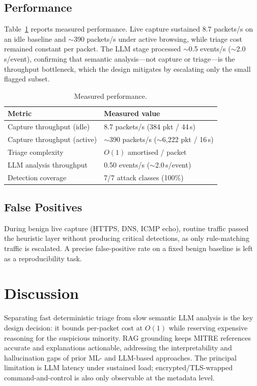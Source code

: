 \documentclass[conference]{IEEEtran}
\begin{document}
\subsection{Performance}
Table~\ref{tab:perf} reports measured performance. Live capture sustained $8.7$ packets/s on an idle baseline and $\sim$390 packets/s under active browsing, while triage cost remained constant per packet. The LLM stage processed $\sim$0.5 events/s ($\sim$2.0\,s/event), confirming that semantic analysis---not capture or triage---is the throughput bottleneck, which the design mitigates by escalating only the small flagged subset.

\begin{table}[t]
\caption{Measured performance.}
\label{tab:perf}
\centering
\footnotesize
\begin{tabular}{@{}ll@{}}
\toprule
Metric & Measured value \\
\midrule
Capture throughput (idle)   & 8.7 packets/s (384 pkt / 44\,s) \\
Capture throughput (active) & $\sim$390 packets/s ($\sim$6{,}222 pkt / 16\,s) \\
Triage complexity           & $O(1)$ amortised / packet \\
LLM analysis throughput     & 0.50 events/s ($\sim$2.0\,s/event) \\
Detection coverage          & 7/7 attack classes (100\%) \\
\bottomrule
\end{tabular}
\end{table}

\subsection{False Positives}
During benign live capture (HTTPS, DNS, ICMP echo), routine traffic passed the heuristic layer without producing critical detections, as only rule-matching traffic is escalated. A precise false-positive rate on a fixed benign baseline is left as a reproducibility task.

\section{Discussion}
Separating fast deterministic triage from slow semantic LLM analysis is the key design decision: it bounds per-packet cost at $O(1)$ while reserving expensive reasoning for the suspicious minority. RAG grounding keeps MITRE references accurate and explanations actionable, addressing the interpretability and hallucination gaps of prior ML- and LLM-based approaches. The principal limitation is LLM latency under sustained load; encrypted/TLS-wrapped command-and-control is also only observable at the metadata level.
\end{document}
